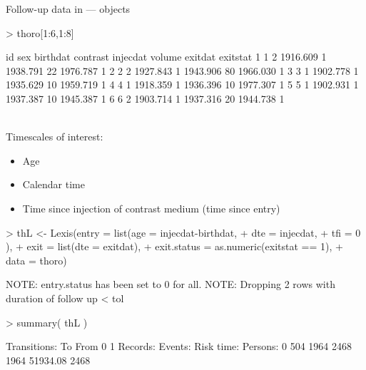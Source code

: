 \begin{frame}{Follow-up data in  ---  objects}
\begin{Schunk}
\begin{Sinput}
> thoro[1:6,1:8]
\end{Sinput}
\begin{Soutput}
  id sex birthdat contrast injecdat volume  exitdat exitstat
1  1   2 1916.609        1 1938.791     22 1976.787        1
2  2   2 1927.843        1 1943.906     80 1966.030        1
3  3   1 1902.778        1 1935.629     10 1959.719        1
4  4   1 1918.359        1 1936.396     10 1977.307        1
5  5   1 1902.931        1 1937.387     10 1945.387        1
6  6   2 1903.714        1 1937.316     20 1944.738        1
\end{Soutput}
\end{Schunk}
\ \\[-1em]
Timescales of interest:
  \begin{itemize}
  \item Age
  \item Calendar time
  \item Time since injection of contrast medium (time since entry)
  \end{itemize}
\begin{Schunk}
\begin{Sinput}
> thL <- Lexis(entry = list(age = injecdat-birthdat,
+                           dte = injecdat,
+                           tfi = 0 ),
+               exit = list(dte = exitdat),
+        exit.status = as.numeric(exitstat == 1),
+               data = thoro)
\end{Sinput}
\begin{Soutput}
NOTE: entry.status has been set to 0 for all.
NOTE: Dropping  2  rows with duration of follow up < tol
\end{Soutput}
\begin{Sinput}
> summary( thL )
\end{Sinput}
\begin{Soutput}
Transitions:
     To
From   0    1  Records:  Events: Risk time:  Persons:
   0 504 1964      2468     1964   51934.08      2468
\end{Soutput}
\end{Schunk}
\end{frame}

